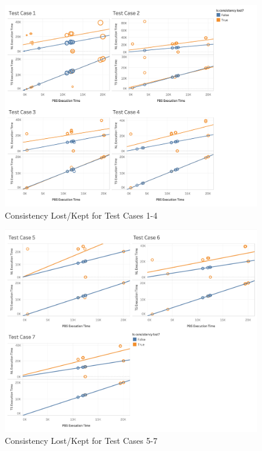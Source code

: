 \begin{figure}
\centering
\includegraphics[scale=0.13]{images/Dashboard1_TL.png}
\caption{Consistency Lost/Kept for Test Cases 1-4}
\label{results:consistency_test_case_graphs_1_4}
\end{figure}

\begin{figure}
\centering
\includegraphics[scale=0.21]{images/Dashboard2_TL.png}
\caption{Consistency Lost/Kept for Test Cases 5-7}
\label{results:consistency_test_case_graphs_5_7}
\end{figure}